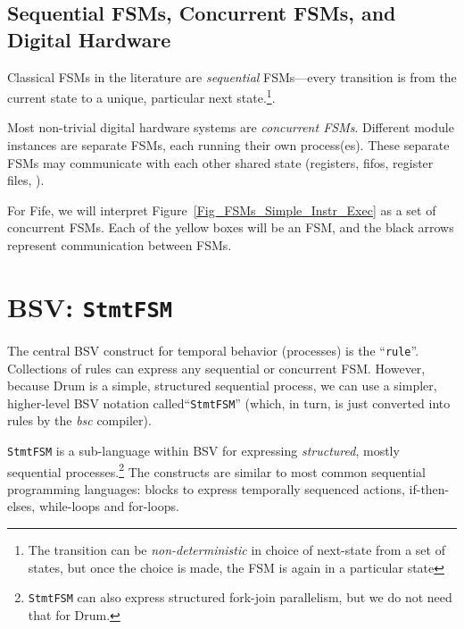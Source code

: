 \subsection{Sequential FSMs, Concurrent FSMs, and Digital Hardware}


Classical FSMs in the literature are \emph{sequential} FSMs---every
transition is from the current state to a unique, particular next
state.\footnote{The transition can be \emph{non-deterministic} in
choice of next-state from a set of states, but once the choice is
made, the FSM is again in a particular state}.

Most non-trivial digital hardware systems are \emph{concurrent FSMs}.
Different module instances are separate FSMs, each running their own
process(es).  These separate FSMs may communicate with each other
{\via} shared state (registers, fifos, register files, {\etc}).


For Fife, we will interpret Figure~\ref{Fig_FSMs_Simple_Instr_Exec} as
a set of concurrent FSMs.  Each of the yellow boxes will be an FSM,
and the black arrows represent communication between FSMs.


\section{BSV: {\tt StmtFSM}}

\label{Sec_FSMs_StmtFSM}


The central BSV construct for temporal behavior (processes) is the
``\verb|rule|''.  Collections of rules can express any sequential or
concurrent FSM.  However, because Drum is a simple, structured
sequential process, we can use a simpler, higher-level BSV notation
called``\verb|StmtFSM|'' (which, in turn, is just converted into rules
by the \emph{bsc} compiler).

\verb|StmtFSM| is a sub-language within BSV for expressing
\emph{structured}, mostly sequential processes.\footnote{{\tt StmtFSM}
can also express structured fork-join parallelism, but we do not need
that for Drum.}  The constructs are similar to most common
sequential programming languages: blocks to express temporally
sequenced actions, if-then-elses, while-loops and for-loops.


